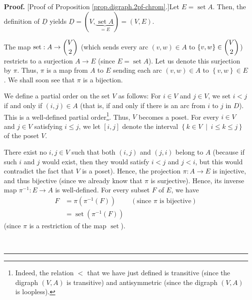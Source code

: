 \documentclass[numbers=enddot,12pt,final,onecolumn,notitlepage]{scrartcl}%
\theoremstyle{definition}
\newenvironment{proof}[1][Proof]{\noindent\textbf{#1.} }{\ \rule{0.5em}{0.5em}}
\newenvironment{vershort}{}{}
\begin{document}
\begin{vershort}
\begin{proof}
[Proof of Proposition \ref{prop.digraph.2pf-chrom}.]Let $E=\operatorname*{set}%
A$. Then, the definition of $\underline{D}$ yields $\underline{D}=\left(
V,\underbrace{\operatorname*{set}A}_{=E}\right)  =\left(  V,E\right)  $.

The map $\operatorname*{set}:A\rightarrow\dbinom{V}{2}$ (which sends every arc
$\left(  v,w\right)  \in A$ to $\left\{  v,w\right\}  \in\dbinom{V}{2}$)
restricts to a surjection $A\rightarrow E$ (since $E=\operatorname*{set}A$).
Let us denote this surjection by $\pi$. Thus, $\pi$ is a map from $A$ to $E$
sending each arc $\left(  v,w\right)  \in A$ to $\left\{  v,w\right\}  \in E$.
We shall soon see that $\pi$ is a bijection.

We define a partial order on the set $V$ as follows: For $i\in V$ and $j\in
V$, we set $i<j$ if and only if $\left(  i,j\right)  \in A$ (that is, if and
only if there is an arc from $i$ to $j$ in $D$). This is a well-defined
partial order\footnote{Indeed, the relation $<$ that we have just defined is
transitive (since the digraph $\left(  V,A\right)  $ is transitive) and
antisymmetric (since the digraph $\left(  V,A\right)  $ is loopless).}. Thus,
$V$ becomes a poset. For every $i\in V$ and $j\in V$ satisfying $i\leq j$, we
let $\left[  i,j\right]  $ denote the interval $\left\{  k\in V\ \mid\ i\leq
k\leq j\right\}  $ of the poset $V$.

There exist no $i,j\in V$ such that both $\left(  i,j\right)  $ and $\left(
j,i\right)  $ belong to $A$ (because if such $i$ and $j$ would exist, then
they would satisfy $i<j$ and $j<i$, but this would contradict the fact that
$V$ is a poset). Hence, the projection $\pi:A\rightarrow E$ is injective, and
thus bijective (since we already know that $\pi$ is surjective). Hence, its
inverse map $\pi^{-1}:E\rightarrow A$ is well-defined. For every subset $F$ of
$E$, we have%
\begin{align}
F  &  =\pi\left(  \pi^{-1}\left(  F\right)  \right)
\ \ \ \ \ \ \ \ \ \ \left(  \text{since }\pi\text{ is bijective}\right)
\nonumber\\
&  =\operatorname*{set}\left(  \pi^{-1}\left(  F\right)  \right)
\label{pf.prop.digraph.2pf-chrom.short.F=set}%
\end{align}
(since $\pi$ is a restriction of the map $\operatorname*{set}$).


\end{proof}
\end{vershort}
\end{document}
